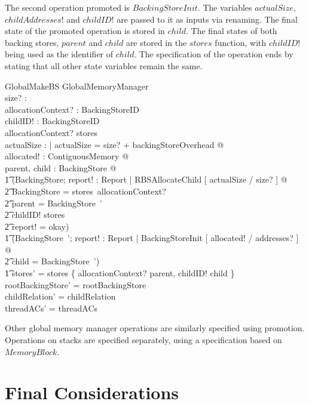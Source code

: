 \documentclass[a4paper,10pt]{report}
\begin{document}
The second operation promoted is $BackingStoreInit$. The variables
$actualSize$, $childAddresses!$ and $childID!$ are passed to it as inputs via
renaming. The final state of the promoted operation is stored in $child$.  The final 
states of both backing stores, $parent$ and $child$ are stored in the $stores$
function, with $childID!$ being used as the identifier of $child$. The 
specification of the operation ends by stating that all other state variables
remain the same.
%
\begin{schema}{GlobalMakeBS}
  \Delta GlobalMemoryManager \\
  size? : \nat \\
  allocationContext? : BackingStoreID \\
  childID! : BackingStoreID \\
\where
  allocationContext? \in \dom stores \\
  \exists actualSize : \nat | actualSize = size? + backingStoreOverhead @ \\
  \exists allocated! : ContiguousMemory @ \\
  \exists parent, child : BackingStore @ \\
  \t1 (\exists \Delta BackingStore; report! : Report | RBSAllocateChild [ actualSize / size? ] @ \\
    \t2 \theta BackingStore = stores~allocationContext? \land \\
    \t2 parent = \theta BackingStore~' \land \\
    \t2 childID! \notin \dom stores \land \\
    \t2 report! = okay) \land \\
  \t1 (\exists BackingStore~'; report! : Report | BackingStoreInit [ allocated! / addresses? ] @ \\
    \t2 child = \theta BackingStore~') \land \\
  \t1 stores' = stores \oplus \{ allocationContext? \mapsto parent, childID! \mapsto child \} \\
  rootBackingStore' = rootBackingStore \\
  childRelation' = childRelation \\
  threadACs' = threadACs \\
\end{schema}
%
Other global memory manager operations are similarly specified using
promotion. Operations on stacks are specified separately, using a
specification based on $MemoryBlock$.

\section{Final Considerations}
\end{document}
